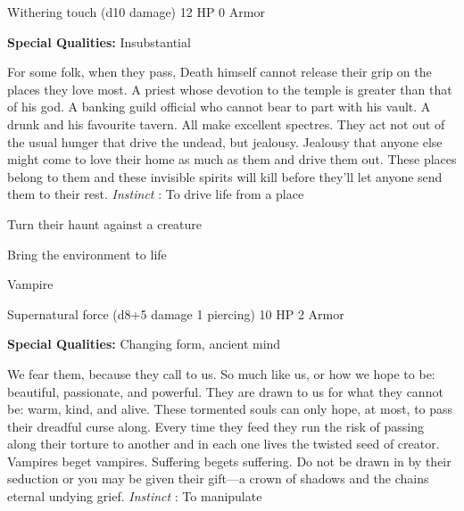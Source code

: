 Withering touch (d10 damage)	12 HP	0 Armor

 


 
\startMonsterQualities
{\bf Special Qualities:}  Insubstantial
\stopMonsterQualities
 
\startMonsterDescription
For some folk, when they pass, Death himself cannot release their grip on the places they love most.  A priest whose devotion to the temple is greater than that of his god.  A banking guild official who cannot bear to part with his vault.  A drunk and his favourite tavern.  All make excellent spectres.  They act not out of the usual hunger that drive the undead, but jealousy.  Jealousy that anyone else might come to love their home as much as them and drive them out.  These places belong to them and these invisible spirits will kill before they’ll let anyone send them to their rest. {\em Instinct} : To drive life from a place
\stopMonsterDescription
 
\startitemize[1,packed]

\item Turn their haunt against a creature

 
\item Bring the environment to life


\stopitemize
 
\startMonsterName
Vampire	 
\stopMonsterName
 

Supernatural force (d8+5 damage 1 piercing)	10 HP	2 Armor

 


 
\startMonsterQualities
{\bf Special Qualities:}  Changing form, ancient mind
\stopMonsterQualities
 
\startMonsterDescription
We fear them, because they call to us.  So much like us, or how we hope to be: beautiful, passionate, and powerful.  They are drawn to us for what they cannot be: warm, kind, and alive.  These tormented souls can only hope, at most, to pass their dreadful curse along.  Every time they feed they run the risk of passing along their torture to another and in each one lives the twisted seed of creator.  Vampires beget vampires.  Suffering begets suffering.  Do not be drawn in by their seduction or you may be given their gift—a crown of shadows and the chains eternal undying grief. {\em Instinct} : To manipulate
\stopMonsterDescription
 
\startitemize[1,packed]

